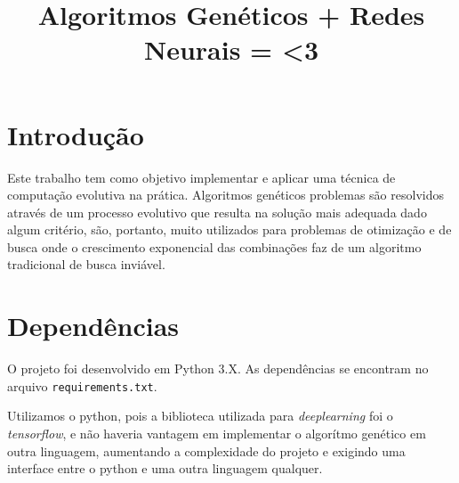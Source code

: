 \documentclass[twoside,conference,a4paper]{IEEEtran}
\begin{document}
\renewcommand{\IEEEkeywordsname}{Palavras-chave}


\title{Algoritmos Genéticos + Redes Neurais = <3}
\author{%
}


\maketitle


\section{Introdução}

Este trabalho tem como objetivo implementar e aplicar uma técnica de computação evolutiva na prática.
Algoritmos genéticos problemas são resolvidos através de um processo evolutivo que resulta na solução mais adequada dado algum critério, são, portanto, muito utilizados para problemas de otimização e de busca onde o crescimento exponencial das combinações faz de um algoritmo tradicional de busca inviável.

\section{Dependências}

O projeto foi desenvolvido em Python 3.X. As dependências se encontram no arquivo \texttt{requirements.txt}.

Utilizamos o python, pois a biblioteca utilizada para \emph{deeplearning} foi o \emph{tensorflow}, e não haveria vantagem em implementar o algorítmo genético em outra linguagem, aumentando a complexidade do projeto e exigindo uma interface entre o python e uma outra linguagem qualquer.
\end{document}
